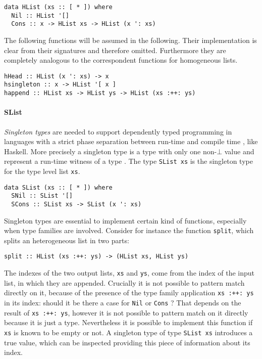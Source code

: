 \documentclass[../Thesis.tex]{subfiles}
\begin{document}
\begin{verbatim}
data HList (xs :: [ * ]) where
  Nil :: HList '[] 
  Cons :: x -> HList xs -> HList (x ': xs) 
\end{verbatim}

	The following functions will be assumed in the following.
	Their implementation is clear from their
	signatures and therefore omitted. 
	Furthermore they are completely analogous to 
	the correspondent functions for homogeneous lists.
	
\begin{verbatim}
hHead :: HList (x ': xs) -> x
hsingleton :: x -> HList '[ x ]
happend :: HList xs -> HList ys -> HList (xs :++: ys)
\end{verbatim}

	\paragraph{SList}
	\emph{Singleton types} are needed to support dependently 
	typed programming in languages with a strict phase separation
	between run-time and compile time \cite{Eisenberg12DTPS}, like Haskell.
	More precisely a singleton type is a type with only one non-$\bot$ value 
	and represent a run-time witness of a type \cite{Eisenberg12DTPS}.
	The type \texttt{SList xs} is the singleton type for the type level list 
	\texttt{xs}.
	
\begin{verbatim}
data SList (xs :: [ * ]) where
  SNil :: SList '[]
  SCons :: SList xs -> SList (x ': xs)
\end{verbatim}

	Singleton types are essential to implement certain kind of functions,
	especially when type families are involved.
	Consider for instance the function \texttt{split}, which
	splits an heterogeneous list in two parts:
\begin{verbatim}
split :: HList (xs :++: ys) -> (HList xs, HList ys)
\end{verbatim}

	The indexes of the two output lists, \texttt{xs} and \texttt{ys},
	come from the index of the input list, in which they are appended.
	Crucially it is not possible to pattern match directly on it, because
	of the presence of the type family application \texttt{xs :++: ys} in
	its index:
	should it be 	there a case for \texttt{Nil} or \texttt{Cons} ?
	That depends on the result of \texttt{xs :++: ys}, 
	however it is not possible to pattern match on it 
	directly because it is just a type.
	Nevertheless it is possible to implement this function if \texttt{xs}
	is known to be empty or not.
	A singleton type of type \texttt{SList xs}
	introduces a true value, which can be inspected 
	providing this piece of information about its index.
	
\end{document}
